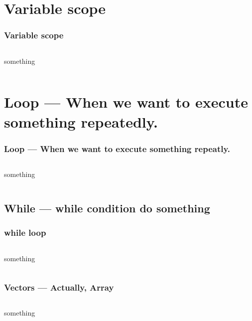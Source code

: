 \documentclass[en, 11pt, xcolor=dvipsnames]{beamer}
\begin{document}
\section{Variable scope}
\begin{frame}
	\frametitle{Variable scope}

	\begin{columns}[c]
		\begin{column}{0.98\textwidth}
			something

		\end{column}
	\end{columns}
\end{frame}


\section{Loop --- When we want to execute something repeatedly.}
\begin{frame}
	\frametitle{Loop --- When we want to execute something repeatly.}

	\begin{columns}[c]
		\begin{column}{0.98\textwidth}
			something

		\end{column}
	\end{columns}
\end{frame}

\subsection{While --- while condition do something}
\begin{frame}[fragile]
	\frametitle{while loop}

	\begin{columns}[c]
		\begin{column}{0.9\textwidth}
			something


		\end{column}
	\end{columns}

\end{frame}

\subsubsection{Vectors --- Actually, Array}
\begin{frame}[fragile]

	\begin{columns}[c]
		\begin{column}{0.98\textwidth}
			something


		\end{column}
	\end{columns}

\end{frame}
\end{document}
